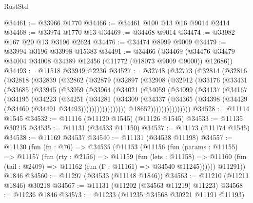 \begin{lexlean}{RustStd}
\begin{coremodule}
@34461 := @33966 @1770
@34466 := @34461 @100 @13 @16 @9014 @2414
@34468 := @33974 @1770 @13
@34469 := @34468 @9014
@34474 := @33982 @167 @20 @13 @3196 @2624
@34476 := @34474 @8999 @9009
@34479 := @33994 @3196 @33998 @15383
@34491 := @34466
    (@34469 (@34476 @34479 @34004 @34008 @34389 @12456 (@11772 (@18073 @9009 @9000)) @12686))
@34493 := @11518 @33949 @2236
@34527 := @32748
    (@32773
      (@32814
        (@32816
          (@32818
            (@32839
              (@32862
                (@32879
                  (@32897
                    (@32908
                      (@32912
                        (@33176
                          (@33431
                            (@33685
                              (@33945
                                (@33959
                                  (@33964
                                    (@34021
                                      (@34059
                                        (@34099
                                          (@34137
                                            (@34167
                                              (@34195
                                                (@34223
                                                  (@34251
                                                    (@34281
                                                      (@34309
                                                        (@34337
                                                          (@34365
                                                            (@34398
                                                              (@34429
                                                                (@34460
                                                                  (@34491 @34493)))))))))))))))))
                                  @18652)))))))))))))))
@34528 := @11114 @1545
@34532 := @11116 (@11120 @1545) (@11126 @1545)
@34533 := @11135 @30215
@34535 := @11131 (@34533 @11150)
@34537 := @11173 (@11174 @1545)
@34538 := @11169 @34537
@34540 := @11131 (@34538 @11198)
@34557 := @11130
    (fun (fn : @76) =>
    @34535
      (@11153
        (@11156
          (fun (params : @11155) =>
          @11157
            (fun (rty : @2156) =>
            @11159
              (fun (lets : @11158) =>
              @11160 (fun (tail : @2409) => @11162 (fun (Γ : @11161) => @34540 @11245))))))
        @11291))
    @1846
@34560 := @11297 (@34533 (@11148 @1846))
@34563 := @11210 (@11211 @1846) @30218
@34567 := @11131 (@11202 (@34563 @11219) @11223)
@34568 := @11236 @1846
@34573 := @11233 (@11235 @34568 @30221 @11191 @11193)

\end{coremodule}
\end{lexlean}
